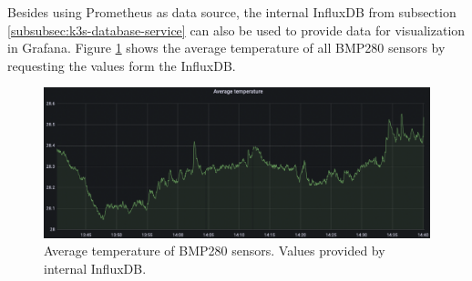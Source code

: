 Besides using Prometheus as data source, the internal InfluxDB from subsection \ref{subsubsec:k3s-database-service} can also be used to provide data for visualization in Grafana. Figure \ref{fig:k3s-grafana-sensor-temperature-png} shows the average temperature of all BMP280 sensors by requesting the values form the InfluxDB.

\begin{figure}[H]
    \centering
    \includegraphics[width=\textwidth]{assets/k3s/screenshots/grafana-sensor-temperature-png.png}
    \caption{Average temperature of BMP280 sensors. Values provided by internal InfluxDB.}\label{fig:k3s-grafana-sensor-temperature-png}
\end{figure}

